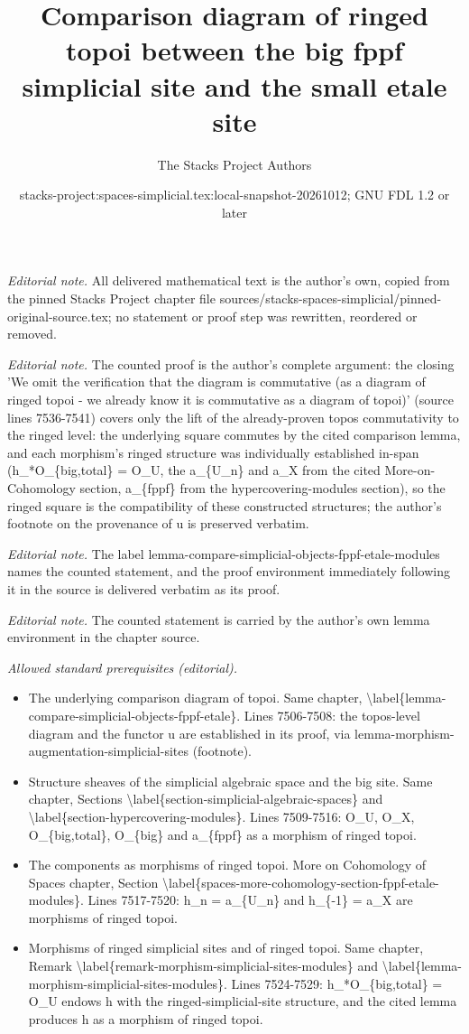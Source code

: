 \documentclass{stacks-project}
\title{Comparison diagram of ringed topoi between the big fppf simplicial site and the small etale site}
\author{The Stacks Project Authors}
\date{stacks-project:spaces-simplicial.tex:local-snapshot-20261012; GNU FDL 1.2 or later}
\theoremstyle{plain}
\theoremstyle{definition}
\theoremstyle{remark}
\numberwithin{equation}{subsection}
\begin{document}
\maketitle
\noindent\textit{Editorial note.} All delivered mathematical text is the author's own, copied from the pinned Stacks Project chapter file sources/stacks-spaces-simplicial/pinned-original-source.tex; no statement or proof step was rewritten, reordered or removed.\par\medskip
\noindent\textit{Editorial note.} The counted proof is the author's complete argument: the closing 'We omit the verification that the diagram is commutative (as a diagram of ringed topoi - we already know it is commutative as a diagram of topoi)' (source lines 7536-7541) covers only the lift of the already-proven topos commutativity to the ringed level: the underlying square commutes by the cited comparison lemma, and each morphism's ringed structure was individually established in-span (h\_*O\_\{big,total\} = O\_U, the a\_\{U\_n\} and a\_X from the cited More-on-Cohomology section, a\_\{fppf\} from the hypercovering-modules section), so the ringed square is the compatibility of these constructed structures; the author's footnote on the provenance of u is preserved verbatim.\par\medskip
\noindent\textit{Editorial note.} The label lemma-compare-simplicial-objects-fppf-etale-modules names the counted statement, and the proof environment immediately following it in the source is delivered verbatim as its proof.\par\medskip
\noindent\textit{Editorial note.} The counted statement is carried by the author's own lemma environment in the chapter source.\par\medskip
\noindent\textit{Allowed standard prerequisites (editorial).}\begin{itemize}
\item The underlying comparison diagram of topoi. Same chapter, \textbackslash{}label\{lemma-compare-simplicial-objects-fppf-etale\}. Lines 7506-7508: the topos-level diagram and the functor u are established in its proof, via lemma-morphism-augmentation-simplicial-sites (footnote).
\item Structure sheaves of the simplicial algebraic space and the big site. Same chapter, Sections \textbackslash{}label\{section-simplicial-algebraic-spaces\} and \textbackslash{}label\{section-hypercovering-modules\}. Lines 7509-7516: O\_U, O\_X, O\_\{big,total\}, O\_\{big\} and a\_\{fppf\} as a morphism of ringed topoi.
\item The components as morphisms of ringed topoi. More on Cohomology of Spaces chapter, Section \textbackslash{}label\{spaces-more-cohomology-section-fppf-etale-modules\}. Lines 7517-7520: h\_n = a\_\{U\_n\} and h\_\{-1\} = a\_X are morphisms of ringed topoi.
\item Morphisms of ringed simplicial sites and of ringed topoi. Same chapter, Remark \textbackslash{}label\{remark-morphism-simplicial-sites-modules\} and \textbackslash{}label\{lemma-morphism-simplicial-sites-modules\}. Lines 7524-7529: h\_*O\_\{big,total\} = O\_U endows h with the ringed-simplicial-site structure, and the cited lemma produces h as a morphism of ringed topoi.
\end{itemize}\medskip
\end{document}
